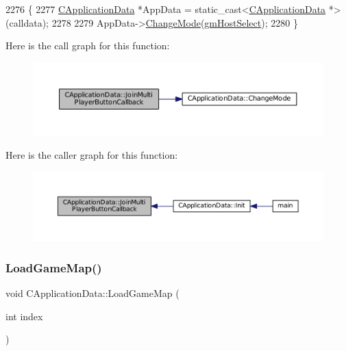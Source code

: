 \begin{DoxyCode}
2276                                                                   \{
2277     \hyperlink{classCApplicationData}{CApplicationData} *AppData = \textcolor{keyword}{static\_cast<}\hyperlink{classCApplicationData}{CApplicationData} *\textcolor{keyword}{>}(calldata);
2278  
2279     AppData->\hyperlink{classCApplicationData_aee18c113e9a0acb3cad3d63eb19de71b}{ChangeMode}(\hyperlink{classCApplicationData_ac8ac37a4c8bb871036fbbdc6a072e403a52495c9194d08aa240ec79eb1e3e0d41}{gmHostSelect});
2280 \}
\end{DoxyCode}
Here is the call graph for this function\+:
\nopagebreak
\begin{figure}[H]
\begin{center}
\leavevmode
\includegraphics[width=350pt]{classCApplicationData_a4fa8cf7a67c0ae980d38e1fe7b967f41_cgraph}
\end{center}
\end{figure}
Here is the caller graph for this function\+:
\nopagebreak
\begin{figure}[H]
\begin{center}
\leavevmode
\includegraphics[width=350pt]{classCApplicationData_a4fa8cf7a67c0ae980d38e1fe7b967f41_icgraph}
\end{center}
\end{figure}
\hypertarget{classCApplicationData_a89af0c7917be766575720e5ac79c8d2d}{}\label{classCApplicationData_a89af0c7917be766575720e5ac79c8d2d} 
\subsubsection{\texorpdfstring{Load\+Game\+Map()}{LoadGameMap()}}
{\footnotesize\ttfamily void C\+Application\+Data\+::\+Load\+Game\+Map (\begin{DoxyParamCaption}\item[{int}]{index }\end{DoxyParamCaption})\hspace{0.3cm}{\ttfamily [protected]}}



